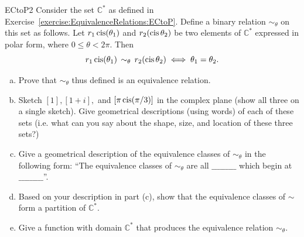 \begin{exercise}{ECtoP2}
Consider the set $\mathbb{C}^*$ as defined in Exercise~\ref{exercise:EquivalenceRelations:ECtoP}. Define a binary relation $\sim_{\theta}$ on this set as follows.  Let $ r_1 \operatorname{cis}(\theta_1)$ and $r_2(\operatorname{cis} \theta_2)$  be two elements of $\mathbb{C}^*$ expressed in polar form, where $0 \le \theta < 2\pi$. Then
\[ r_1 \operatorname{cis}(\theta_1) \, \sim_{\theta} \, r_2(\operatorname{cis} \theta_2)  \iff \theta_1 = \theta_2.\]

\begin{enumerate}[(a)]
\item
Prove that $\sim_{\theta}$ thus defined is an equivalence relation.
\item
Sketch $[1], [1+i],$  and $[\pi \operatorname{cis}(\pi/3)]$ in the complex plane (show all three on a single sketch). Give geometrical descriptions (using words) of each of these sets (i.e. what can you say about the shape, size, and location of these three sets?)
\item 
Give a geometrical description of the equivalence classes of $\sim_{\theta}$ in the following form:  ``The equivalence classes of $\sim_{\theta}$ are all $\_\_\_\_\_\_\_\_\_$ which begin at $\_\_\_\_\_\_\_\_\_$''.
\item
Based on your description in part (c), show that the equivalence classes of $\sim$ form a partition of $\mathbb{C}^*$.
\item
Give a function with domain $\mathbb{C}^*$ that produces the equivalence relation $\sim_{\theta}$. 
\end{enumerate}
\end{exercise}



